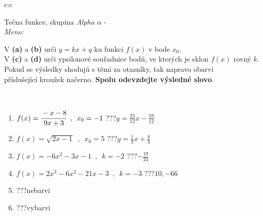 \documentclass[10pt]{report}
\begin{document}
\thispagestyle{empty}
\begin{tabular}{c:c}
\begin{minipage}[c][104.5mm][t]{0.5\linewidth}
\begin{center}
\vspace{7mm}
{\huge Tečna funkce, skupina \textit{Alpha $\alpha$} -}\\[5mm]
\textit{Meno:}\phantom{xxxxxxxxxxxxxxxxxxxxxxxxxxxxxxxxxxxxxxxxxxxxxxxxxxxxxxxxxxxxxxxxx}\\[5mm]
\begin{minipage}{0.95\linewidth}
\begin{center}
V \textbf{(a)} a \textbf{(b)} urči  $y = kx + q$ ku funkci $f(x)$ v bode $x_0$.\\V \textbf{(c)} a \textbf{(d)} urči ypsilonové souřadnice bodů, ve kterých je sklon $f(x)$ rovný $k$.\\Pokud se výsledky shodujú s těmi za otazníky, tak napravo obarvi\\příslušející kroužek načerno. \textbf{Spolu odevzdejte výsledné slovo}.
\end{center}
\end{minipage}
\\[1mm]
\begin{minipage}{0.79\linewidth}
\begin{center}
\begin{varwidth}{\linewidth}
\begin{enumerate}
\small
\item $f(x)=\cfrac{-x-8}{9x+3}\enspace , \enspace x_0=-1$\quad \dotfill\; ???\;\dotfill \quad $y = \frac{23}{12}x-\frac{59}{12}$
\item $f(x)=\sqrt{2x-1}\enspace , \enspace x_0=5$\quad \dotfill\; ???\;\dotfill \quad $y = \frac{1}{3}x+\frac{8}{3}$
\item $f(x)=-6x^2-3x-1\enspace , \enspace k=-2$\quad \dotfill\; ???\;\dotfill \quad $-\frac{19}{24}$
\item $f(x)=2x^3-6x^2-21x-3\enspace , \enspace k=-3$\quad \dotfill\; ???\;\dotfill \quad $10 , -66$
\item \quad \dotfill\; ???\;\dotfill \quad nebarvi
\item \quad \dotfill\; ???\;\dotfill \quad vybarvi
\end{enumerate}
\end{varwidth}
\end{center}
\end{minipage}
\begin{minipage}{0.20\linewidth}

\end{minipage}
\end{center}
\end{minipage}
\end{tabular}
\end{document}

